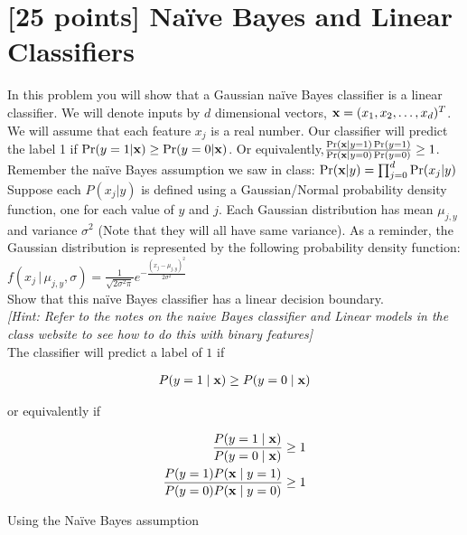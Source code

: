 \section{[25 points] Na\"ive Bayes and Linear Classifiers }
\label{sec:q1}


In this problem you will show that a Gaussian na\"ive Bayes classifier is a linear classifier. We will denote inputs by $d$ dimensional vectors, ${\bf x} = (x_1, x_2,\dots, x_d)^T$. We will assume that each feature $x_j$ is a real number. Our classifier will predict the label 1 if $\Pr(y=1|{\bf x}) \geq \Pr(y=0|{\bf x})$. Or equivalently,$\frac{\Pr({\bf x} | y=1)\Pr(y=1)}{\Pr({\bf x} | y=0)\Pr(y=0)} \geq 1$. Remember the na\"ive Bayes assumption we saw in class: $\Pr({\bf x}|y) = \prod_{j=0}^{d}\Pr(x_j|y)$\\

Suppose each $P(x_j|y)$ is defined using a Gaussian/Normal probability density function, one for each value of $y$ and $j$. Each Gaussian distribution has mean $\mu_{j,y}$ and variance $\sigma^2$ (Note that they will all have same variance). As a reminder, the Gaussian distribution is represented by the following probability density function:$f(x_j\,|\,\mu_{j,y}, \sigma) = \frac{1}{\sqrt{2\sigma^2\pi}}e^{-\frac{(x_j-\mu_{j,y})^2}{2\sigma^2}}$\\

Show that this na\"ive Bayes classifier has a linear decision boundary.\\ \textit{[Hint: Refer to the notes on the naive Bayes classifier and Linear models in the class website to see how to do this with binary features]}\\

The classifier will predict a label of $1$ if 

\begin{equation*}
\begin{aligned}
P(y=1 \mid {\bf x}) \geq P(y=0 \mid {\bf x})
\end{aligned}
\end{equation*}

or equivalently if

\begin{equation*}
\begin{aligned}
\frac{P(y=1 \mid {\bf x}) }{ P(y=0 \mid {\bf x})} \geq 1\\
\frac{P(y=1) P({\bf x}  \mid y=1) }{ P(y=0) P({\bf x} \mid y=0)} \geq 1
\end{aligned}
\end{equation*}

Using the Na\"ive Bayes assumption

